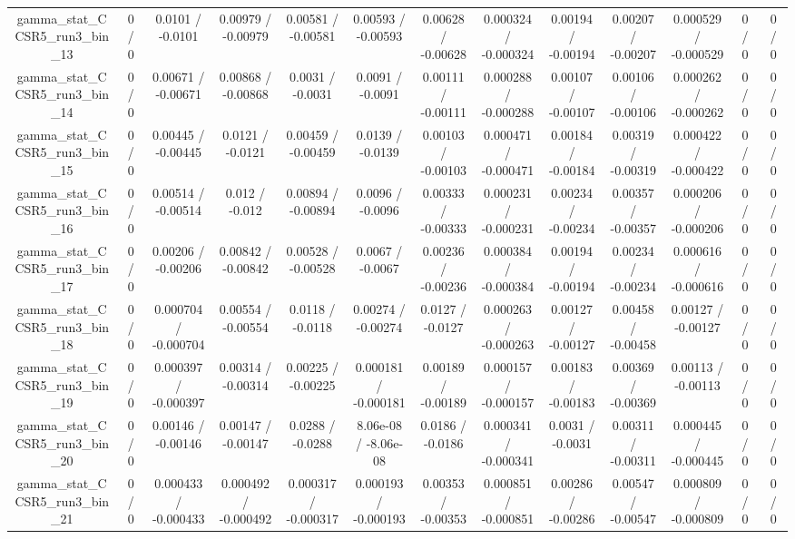 \documentclass[10pt]{article}
\begin{document}
\begin{table}[htbp]
\begin{center}
\begin{tabular}{|c|c|c|c|c|c|c|c|c|c|c|c|c|}
  gamma_stat_CCSR5_run3_bin_13 & 0 / 0 & 0.0101 / -0.0101 & 0.00979 / -0.00979 & 0.00581 / -0.00581 & 0.00593 / -0.00593 & 0.00628 / -0.00628 & 0.000324 / -0.000324 & 0.00194 / -0.00194 & 0.00207 / -0.00207 & 0.000529 / -0.000529 & 0 / 0 & 0 / 0 \\ 
  gamma_stat_CCSR5_run3_bin_14 & 0 / 0 & 0.00671 / -0.00671 & 0.00868 / -0.00868 & 0.0031 / -0.0031 & 0.0091 / -0.0091 & 0.00111 / -0.00111 & 0.000288 / -0.000288 & 0.00107 / -0.00107 & 0.00106 / -0.00106 & 0.000262 / -0.000262 & 0 / 0 & 0 / 0 \\ 
  gamma_stat_CCSR5_run3_bin_15 & 0 / 0 & 0.00445 / -0.00445 & 0.0121 / -0.0121 & 0.00459 / -0.00459 & 0.0139 / -0.0139 & 0.00103 / -0.00103 & 0.000471 / -0.000471 & 0.00184 / -0.00184 & 0.00319 / -0.00319 & 0.000422 / -0.000422 & 0 / 0 & 0 / 0 \\ 
  gamma_stat_CCSR5_run3_bin_16 & 0 / 0 & 0.00514 / -0.00514 & 0.012 / -0.012 & 0.00894 / -0.00894 & 0.0096 / -0.0096 & 0.00333 / -0.00333 & 0.000231 / -0.000231 & 0.00234 / -0.00234 & 0.00357 / -0.00357 & 0.000206 / -0.000206 & 0 / 0 & 0 / 0 \\ 
  gamma_stat_CCSR5_run3_bin_17 & 0 / 0 & 0.00206 / -0.00206 & 0.00842 / -0.00842 & 0.00528 / -0.00528 & 0.0067 / -0.0067 & 0.00236 / -0.00236 & 0.000384 / -0.000384 & 0.00194 / -0.00194 & 0.00234 / -0.00234 & 0.000616 / -0.000616 & 0 / 0 & 0 / 0 \\ 
  gamma_stat_CCSR5_run3_bin_18 & 0 / 0 & 0.000704 / -0.000704 & 0.00554 / -0.00554 & 0.0118 / -0.0118 & 0.00274 / -0.00274 & 0.0127 / -0.0127 & 0.000263 / -0.000263 & 0.00127 / -0.00127 & 0.00458 / -0.00458 & 0.00127 / -0.00127 & 0 / 0 & 0 / 0 \\ 
  gamma_stat_CCSR5_run3_bin_19 & 0 / 0 & 0.000397 / -0.000397 & 0.00314 / -0.00314 & 0.00225 / -0.00225 & 0.000181 / -0.000181 & 0.00189 / -0.00189 & 0.000157 / -0.000157 & 0.00183 / -0.00183 & 0.00369 / -0.00369 & 0.00113 / -0.00113 & 0 / 0 & 0 / 0 \\ 
  gamma_stat_CCSR5_run3_bin_20 & 0 / 0 & 0.00146 / -0.00146 & 0.00147 / -0.00147 & 0.0288 / -0.0288 & 8.06e-08 / -8.06e-08 & 0.0186 / -0.0186 & 0.000341 / -0.000341 & 0.0031 / -0.0031 & 0.00311 / -0.00311 & 0.000445 / -0.000445 & 0 / 0 & 0 / 0 \\ 
  gamma_stat_CCSR5_run3_bin_21 & 0 / 0 & 0.000433 / -0.000433 & 0.000492 / -0.000492 & 0.000317 / -0.000317 & 0.000193 / -0.000193 & 0.00353 / -0.00353 & 0.000851 / -0.000851 & 0.00286 / -0.00286 & 0.00547 / -0.00547 & 0.000809 / -0.000809 & 0 / 0 & 0 / 0 \\ 

\end{tabular}
\end{center}
\end{table}
\end{document}
